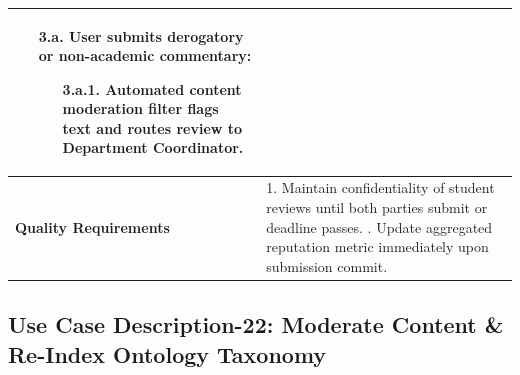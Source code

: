 \begin{table}[H]
\begin{tabularx}{\textwidth}{|l|X|}
\begin{itemize}[leftmargin=*]
    \item[\textbf{3.a.}] \textbf{User submits derogatory or non-academic commentary:}
    \begin{itemize}[leftmargin=*]
        \item[3.a.1.] Automated content moderation filter flags text and routes review to Department Coordinator.
    \end{itemize}
\end{itemize} \\ \hline
\textbf{Quality Requirements} & 
1. Maintain confidentiality of student reviews until both parties submit or deadline passes. \newline
2. Update aggregated reputation metric immediately upon submission commit. \\ \hline
\end{tabularx}
\end{table}

\clearpage
\subsection{Use Case Description-22: Moderate Content \& Re-Index Ontology Taxonomy}
\label{subsec:uc22}

